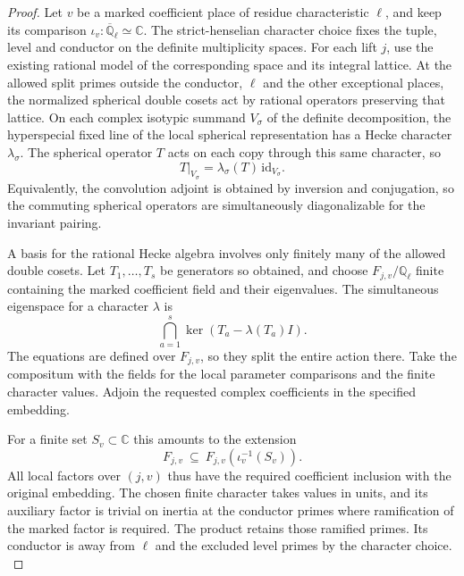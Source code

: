 \begin{proof}
Let \(v\) be a marked coefficient place of residue characteristic
\(\ell\), and keep its comparison \(\iota_v\colon
\overline{\mathbb Q}_\ell\simeq\mathbb C\). The strict-henselian
character choice fixes the tuple, level and conductor on the definite
multiplicity spaces. For each lift \(j\), use the existing rational
model of the corresponding space and its integral lattice. At the
allowed split primes outside the conductor, \(\ell\) and the other
exceptional places, the normalized spherical double cosets act by
rational operators preserving that lattice. On each complex isotypic summand \(V_\sigma\) of the definite decomposition, the hyperspecial fixed line of the local spherical representation has a Hecke character \(\lambda_\sigma\). The spherical operator \(T\) acts on each copy through this same character, so
\[
 T|_{V_\sigma}=\lambda_\sigma(T)\,\mathrm{id}_{V_\sigma}.
\] Equivalently, the convolution adjoint is obtained
by inversion and conjugation, so the commuting spherical operators
are simultaneously diagonalizable for the invariant pairing.

A basis for the rational Hecke algebra involves only finitely many
of the allowed double cosets. Let \(T_1,\ldots,T_s\) be generators
so obtained, and choose \(F_{j,v}/\mathbb Q_\ell\) finite containing
the marked coefficient field and their eigenvalues. The simultaneous
eigenspace for a character \(\lambda\) is
\[
                 \bigcap_{a=1}^s\ker(T_a-\lambda(T_a)I) .
\]
The equations are defined over \(F_{j,v}\), so they split the entire
action there. Take the compositum
with the fields for the local parameter comparisons and the finite
character values. Adjoin the requested complex coefficients in the specified embedding.

For a finite set \(S_v\subset\mathbb C\) this amounts to the extension
\[
 F_{j,v}\ \subseteq\ F_{j,v}(\iota_v^{-1}(S_v)).
\] All local factors over \((j,v)\)
thus have the required coefficient inclusion with the original
embedding. The chosen finite character takes values in units, and
its auxiliary factor is trivial on inertia at the conductor primes
where ramification of the marked factor is required. The product
retains those ramified primes. Its conductor is away from \(\ell\)
and the excluded level primes by the character choice.
\label{cor:automorphic-realization-34}


\end{proof}
